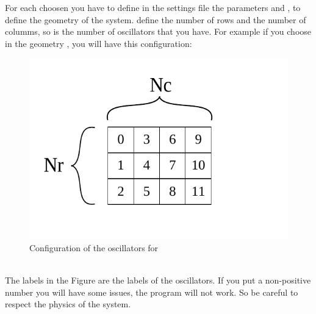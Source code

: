 \documentclass[1pt, a4paper]{article}
\begin{document}
\newpage
\noindent
For each  choosen you have to define in the settings file the parameters  and , to define the geometry of the system.  define the number of rows and  the number of columms, so  is the number of oscillators that you have. For example if you choose  in the geometry , you will have this configuration:\\
\begin{figure}[htbp]
    \centering
    \includegraphics[scale=0.8]{figures/os_table.pdf}
    \caption{Configuration of the oscillators for }
    \label{fig:os_table}
\end{figure}\\
\noindent
The labels in the Figure are the labels of the oscillators. If you put a non-positive number you will have some issues, the program will not work. So be careful to respect the physics of the system.
\end{document}
